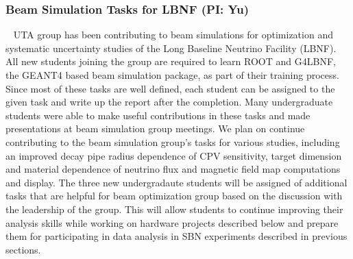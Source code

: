 \subsubsection {Beam Simulation Tasks for LBNF (PI: Yu)}~\label{sec:dune-beam-sim}
UTA group has been contributing to beam simulations for optimization and systematic uncertainty studies of the Long Baseline Neutrino Facility (LBNF). All new students joining the group are required to learn ROOT and G4LBNF, the GEANT4 based beam simulation package, as part of their training process.  Since most of these tasks are well defined, each student can be assigned to the given task and write up the report after the completion. Many undergraduate students were able to make useful contributions in these tasks and made presentations at beam simulation group meetings.  We plan on continue contributing to the beam simulation group's tasks for various studies, including an improved decay pipe radius dependence of CPV sensitivity, target dimension and material dependence of neutrino flux and magnetic field map computations and display. The three new undergradaute students will be assigned of additional tasks that are helpful for beam optimization group based on the discussion with the leadership of the group.  This will allow students to continue improving their analysis skills while working on hardware projects described below and prepare them for participating in data analysis in SBN experiments described in previous sections.
